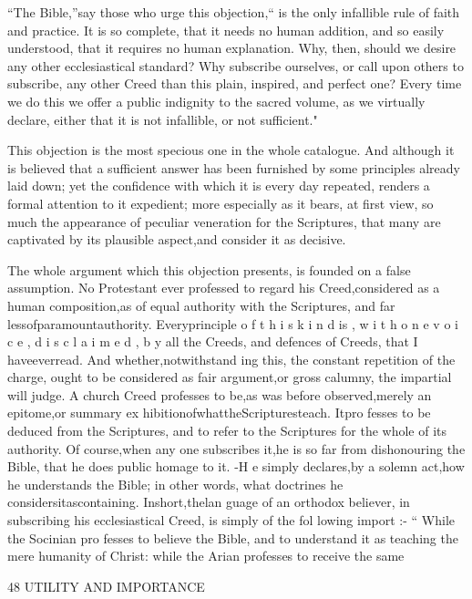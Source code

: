 \documentclass[
]{book}
\begin{document}
``The Bible,''say those who urge this objection,`` is the only infallible rule of faith and practice. It is so complete, that it needs no human addition, and so easily understood, that it requires no human explanation. Why, then, should we desire any other ecclesiastical standard? Why subscribe ourselves, or call upon others to subscribe, any other Creed than this plain, inspired, and perfect one? Every time we do this we offer a public indignity to the sacred volume, as we virtually declare, either that it is not infallible, or not sufficient."

This objection is the most specious one in the whole catalogue. And although it is believed that a sufficient answer has been furnished by some principles already laid down; yet the confidence with which it is every day repeated, renders a formal attention to it expedient; more especially as it bears, at first view, so much the appearance of peculiar veneration for the Scriptures, that many are captivated by its plausible aspect,and consider it as decisive.

The whole argument which this objection presents, is founded on a false assumption. No Protestant ever professed to regard his Creed,considered as a human composition,as of equal authority with the Scriptures, and far
lessofparamountauthority. Everyprinciple o f t h i s k i n d is , w i t h o n e v o i c e , d i s c l a i m e d , b y
all the Creeds, and defences of Creeds, that I
haveeverread. And whether,notwithstand
ing this, the constant repetition of the charge, ought to be considered as fair argument,or
gross calumny, the impartial will judge. A church Creed professes to be,as was before observed,merely an epitome,or summary ex hibitionofwhattheScripturesteach. Itpro fesses to be deduced from the Scriptures, and
to refer to the Scriptures for the whole of its authority. Of course,when any one subscribes it,he is so far from dishonouring the Bible, that he does public homage to it. -H e simply declares,by a solemn act,how he understands
the Bible; in other words, what doctrines he
considersitascontaining. Inshort,thelan
guage of an orthodox believer, in subscribing
his ecclesiastical Creed, is simply of the fol
lowing import :- `` While the Socinian pro fesses to believe the Bible, and to understand
it as teaching the mere humanity of Christ: while the Arian professes to receive the same

48 UTILITY AND IMPORTANCE
\end{document}
